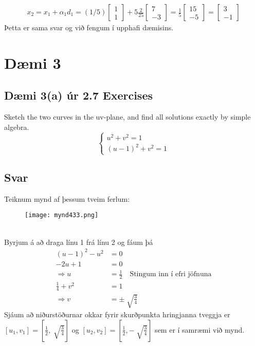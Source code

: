 \documentclass[11pt]{article}
\begin{document}
\begin{align*} %
x_2 = x_1 + \alpha_1d_1 = (1/5)\begin{bmatrix}
1\\1
\end{bmatrix}
+5 \frac{2}{25}
\begin{bmatrix}
7\\-3
\end{bmatrix}
=
\frac 15
\begin{bmatrix}
15\\-5
\end{bmatrix}
=
\begin{bmatrix}
3\\-1
\end{bmatrix}
\end{align*}
Þetta er sama svar og við fengum í upphafi dæmisins.

\newpage
\section*{Dæmi 3}
\subsection*{Dæmi 3(a) úr 2.7 Exercises}
Sketch the two curves in the uv-plane, and find all solutions exactly by simple algebra.
$$
\begin{cases}
u^2+v^2=1\\
(u-1)^2+v^2=1
\end{cases}
$$
\subsection*{Svar}
Teiknum mynd af þessum tveim ferlum:
\begin{figure}[h]
\centering
\texttt{[image: mynd433.png]}
\end{figure}\\
Byrjum á að draga línu 1 frá línu 2 og fáum þá
\begin{align*}
(u-1)^2-u^2 	&= 0\\
	-2u+1		&= 0\\
\Rightarrow u 	&= \frac 12\quad\text{Stingum  inn í efri jöfnuna}\\
\frac 14 + v^2 	&= 1\\
\Rightarrow v 	&= \pm \sqrt[]{\frac 34}
\end{align*}
Sjáum að niðurstöðurnar okkar fyrir skurðpunkta hringjanna tveggja er $[u_1,v_1] = [\frac 12, \sqrt[]{\frac 34}]$ og $[u_2,v_2]=[\frac 12, -\sqrt[]{\frac 34}]$ sem er í samræmi við mynd.
\end{document}
